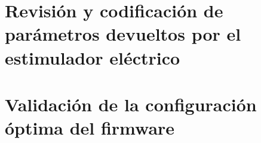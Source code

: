 \section{Revisión y codificación de parámetros devueltos por el estimulador eléctrico}


\section{Validación de la configuración óptima del firmware}
